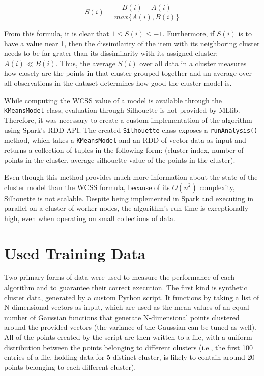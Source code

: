\documentclass{l4proj}
\begin{document}
$$S(i) = \frac{B(i) - A(i)}{max\{A(i), B(i)\}}$$

From this formula, it is clear that $1 \leq S(i) \leq -1$. Furthermore, if $S(i)$ is to have a value near 1, then the dissimilarity of the item with its neighboring cluster needs to be far grater than its dissimilarity with its assigned cluster: $A(i) \ll B(i)$. Thus, the average $S(i)$ over all data in a cluster measures how closely are the points in that cluster grouped together and an average over all observations in the dataset determines how good the cluster model is.

While computing the WCSS value of a model is available through the \texttt{KMeansModel} class, evaluation through Silhouette is not provided by MLlib. Therefore, it was necessary to create a custom implementation of the algorithm using Spark's RDD API. The created \texttt{Silhouette} class exposes a \texttt{runAnalysis()} method, which takes a \texttt{KMeansModel} and an RDD of vector data as input and returns a collection of tuples in the following form: (cluster index, number of points in the cluster, average silhouette value of the points in the cluster).

Even though this method provides much more information about the state of the cluster model than the WCSS formula, because of its $O(n^2)$ complexity, Silhouette is not scalable. Despite being implemented in Spark and executing in parallel on a cluster of worker nodes, the algorithm's run time is exceptionally high, even when operating on small collections of data.

\section{Used Training Data}

Two primary forms of data were used to measure the performance of each algorithm and to guarantee their correct execution. The first kind is synthetic cluster data, generated by a custom Python script. It functions by taking a list of N-dimensional vectors as input, which are used as the mean values of an equal number of Gaussian functions that generate N-dimensional points clustered around the provided vectors (the variance of the Gaussian can be tuned as well). All of the points created by the script are then written to a file, with a uniform distribution between the points belonging to different clusters (i.e., the first 100 entries of a file, holding data for 5 distinct cluster, is likely to contain around 20 points belonging to each different cluster).
\end{document}
